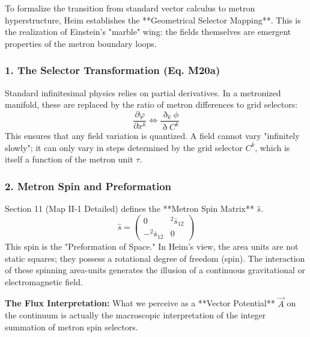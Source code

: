 \documentclass[11pt,a4paper,oneside]{article}
\begin{document}
To formalize the transition from standard vector calculus to metron hyperstructure, Heim establishes the **Geometrical Selector Mapping**. This is the realization of Einstein's "marble" wing: the fields themselves are emergent properties of the metron boundary loops.

\subsubsection*{1. The Selector Transformation (Eq. M20a)}
Standard infinitesimal physics relies on partial derivatives. In a metronized manifold, these are replaced by the ratio of metron differences to grid selectors:
\begin{equation}
    \frac{\partial \varphi}{\partial x^k} \Longleftrightarrow \frac{\eth_k \phi}{\eth C^k}
\end{equation}
This ensures that any field variation is quantized. A field cannot vary "infinitely slowly"; it can only vary in steps determined by the grid selector $C^k$, which is itself a function of the metron unit $\tau$.

\subsubsection*{2. Metron Spin and Preformation}
Section 11 (Map II-1 Detailed) defines the **Metron Spin Matrix** $\hat{s}$. 
\begin{equation}
    \hat{s} = \begin{pmatrix} 0 & {}^2\bar{s}_{12} \\ -{}^2\bar{s}_{12} & 0 \end{pmatrix}
\end{equation}
This spin is the "Preformation of Space." In Heim's view, the area units are not static squares; they possess a rotational degree of freedom (spin). The interaction of these spinning area-units generates the illusion of a continuous gravitational or electromagnetic field.
\begin{mbbcite}
    \textbf{The Flux Interpretation:} What we perceive as a **Vector Potential** $\vec{A}$ on the continuum is actually the macroscopic interpretation of the integer summation of metron spin selectors.
\end{mbbcite}
\end{document}
